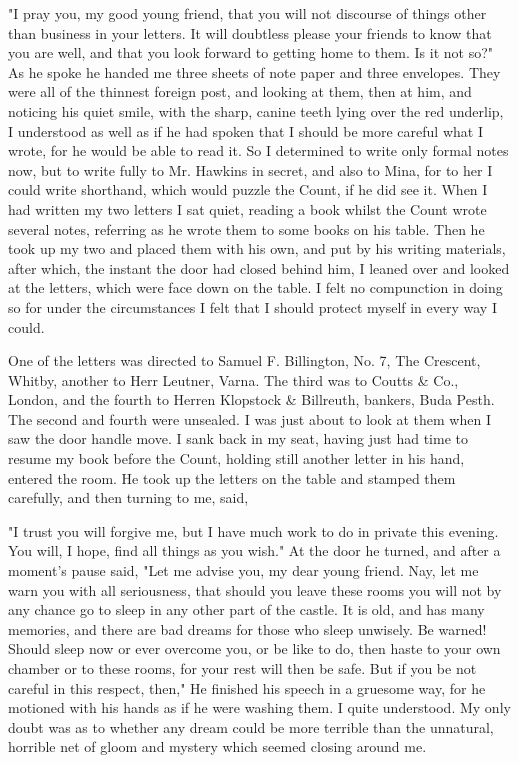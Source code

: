 "I pray you, my good young friend, that you will not discourse of things other than business in your letters. It will doubtless please your friends to know that you are well, and that you look forward to getting home to them. Is it not so?" As he spoke he handed me three sheets of note paper and three envelopes. They were all of the thinnest foreign post, and looking at them, then at him, and noticing his quiet smile, with the sharp, canine teeth lying over the red underlip, I understood as well as if he had spoken that I should be more careful what I wrote, for he would be able to read it. So I determined to write only formal notes now, but to write fully to Mr. Hawkins in secret, and also to Mina, for to her I could write shorthand, which would puzzle the Count, if he did see it. When I had written my two letters I sat quiet, reading a book whilst the Count wrote several notes, referring as he wrote them to some books on his table. Then he took up my two and placed them with his own, and put by his writing materials, after which, the instant the door had closed behind him, I leaned over and looked at the letters, which were face down on the table. I felt no compunction in doing so for under the circumstances I felt that I should protect myself in every way I could. 

One of the letters was directed to Samuel F. Billington, No. 7, The Crescent, Whitby, another to Herr Leutner, Varna. The third was to Coutts & Co., London, and the fourth to Herren Klopstock & Billreuth, bankers, Buda Pesth. The second and fourth were unsealed. I was just about to look at them when I saw the door handle move. I sank back in my seat, having just had time to resume my book before the Count, holding still another letter in his hand, entered the room. He took up the letters on the table and stamped them carefully, and then turning to me, said, 

"I trust you will forgive me, but I have much work to do in private this evening. You will, I hope, find all things as you wish." At the door he turned, and after a moment's pause said, "Let me advise you, my dear young friend. Nay, let me warn you with all seriousness, that should you leave these rooms you will not by any chance go to sleep in any other part of the castle. It is old, and has many memories, and there are bad dreams for those who sleep unwisely. Be warned! Should sleep now or ever overcome you, or be like to do, then haste to your own chamber or to these rooms, for your rest will then be safe. But if you be not careful in this respect, then," He finished his speech in a gruesome way, for he motioned with his hands as if he were washing them. I quite understood. My only doubt was as to whether any dream could be more terrible than the unnatural, horrible net of gloom and mystery which seemed closing around me. 

